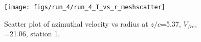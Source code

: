 \begin{figure}[H]
\centering
\texttt{[image: figs/run\_4/run\_4\_T\_vs\_r\_meshscatter]}
\caption{Scatter plot of azimuthal velocity vs radius at $z/c$=5.37, $V_{free}$=21.06, station 1.}
\label{fig:run_4_T_vs_r_meshscatter}
\end{figure}


